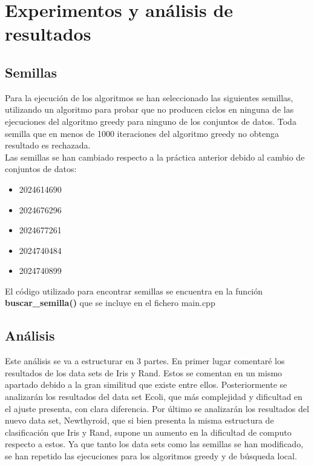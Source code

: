 \chapter{Experimentos y análisis de resultados}
\section{Semillas}
Para la ejecución de los algoritmos se han seleccionado las siguientes semillas, utilizando un algoritmo para probar que no producen ciclos en ninguna de las ejecuciones del algoritmo greedy para ninguno de los conjuntos de datos. Toda semilla que en menos de 1000 iteraciones del algoritmo greedy no obtenga resultado es rechazada. \\
Las semillas se han cambiado respecto a la práctica anterior debido al cambio de conjuntos de datos:
\begin{itemize}
   \item 2024614690
   \item 2024676296
   \item 2024677261
   \item 2024740484
   \item 2024740899
\end{itemize}


El código utilizado para encontrar semillas se encuentra en la función \textbf{buscar\_semilla()} que se incluye en el fichero main.cpp


\section{Análisis}
Este análisis se va a estructurar en 3 partes. En primer lugar comentaré los resultados de los data sets de Iris y Rand. Estos se comentan en un mismo apartado debido a la gran similitud que existe entre ellos. Posteriormente se analizarán los resultados del data set Ecoli, que más complejidad y dificultad en el ajuste presenta, con clara diferencia. Por último se analizarán los resultados del nuevo data set, Newthyroid, que si bien presenta la misma estructura de clasificación que Iris y Rand, supone un aumento en la dificultad de computo respecto a estos. Ya que tanto los data sets como las semillas se han modificado, se han repetido las ejecuciones para los algoritmos greedy y de búsqueda local.

